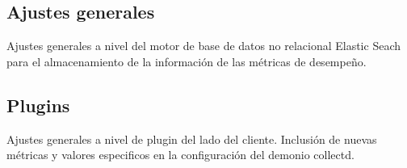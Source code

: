 \newpage

\subsection{Ajustes generales}
Ajustes generales a nivel del motor de base de datos no relacional Elastic Seach para el almacenamiento de la información de las métricas de desempeño.


\subsection{Plugins}

Ajustes generales a nivel de plugin del lado del cliente. Inclusión de nuevas métricas y valores especificos en la configuración del demonio collectd.




